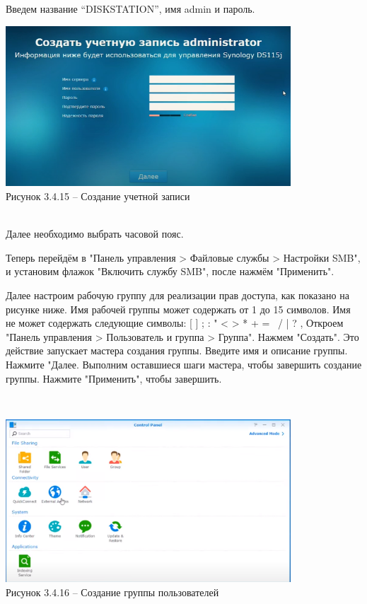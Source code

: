     Введем название “DISKSTATION”, имя admin и пароль.
    \\
    \begin{center}
        \includegraphics[width=0.8\textwidth]{images/login}\\
        Рисунок 3.4.15 – Создание учетной записи
    \end{center}
    \\
    Далее необходимо выбрать часовой пояс.

    Теперь перейдём в "Панель управления > Файловые службы > Настройки SMB",
    и установим флажок "Включить службу SMB", после нажмём "Применить".

    Далее настроим рабочую группу для реализации прав доступа, как показано на рисунке ниже.
    Имя рабочей группы может содержать от 1 до 15 символов.
    Имя не может содержать следующие символы: [ ] ; : " < > * + = \ / | ? ,
    Откроем "Панель управления > Пользователь и группа > Группа".
    Нажмем "Создать".
    Это действие запускает мастера создания группы.
    Введите имя и описание группы.
    Нажмите "Далее.
    Выполним оставшиеся шаги мастера, чтобы завершить создание группы.
    Нажмите "Применить", чтобы завершить.

    \\
    \begin{center}
        \includegraphics[width=0.8\textwidth]{images/creategroup}\\
        Рисунок 3.4.16 – Создание группы пользователей
    \end{center}
    \\


